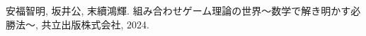\documentclass[uplatex,dvipdfmx,a4paper,10pt]{jsarticle}
\theoremstyle{definition}
\begin{document}
\begin{thebibliography}{99}
   安福智明, 坂井公, 末續鴻輝. 組み合わせゲーム理論の世界〜数学で解き明かす必勝法〜, 共立出版株式会社, 2024.
\end{thebibliography}

\appendix
\setcounter{figure}{0}
\setcounter{table}{0}
\renewcommand{\thetable}{\Alph{section}\arabic{table}}
\renewcommand{\thefigure}{\Alph{section}\arabic{figure}}
\makeatletter 
\newcommand{\section@cntformat}{付録 \thesection:\ }
\makeatother

    
\end{document}
